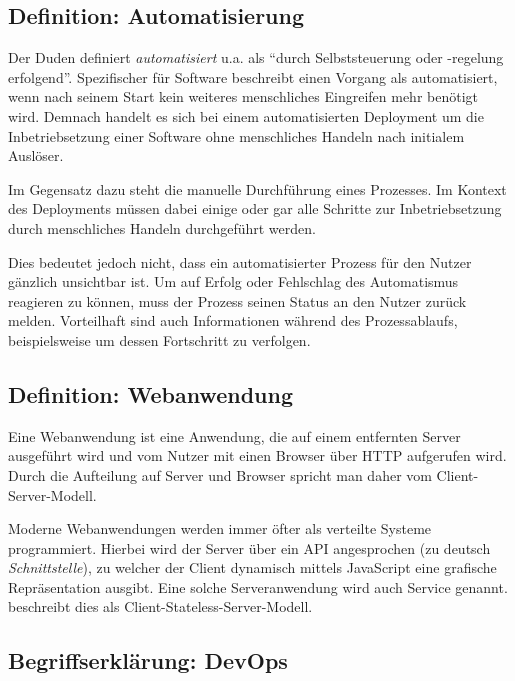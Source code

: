 \subsection{Definition: Automatisierung}

Der Duden \citeyearpar{Duden} definiert \emph{automatisiert} u.a. als ``durch Selbststeuerung oder -regelung erfolgend''. Spezifischer für Software beschreibt \citet[27]{Duvall2007} einen Vorgang als automatisiert, wenn nach seinem Start kein weiteres menschliches Eingreifen mehr benötigt wird. Demnach handelt es sich bei einem automatisierten Deployment um die Inbetriebsetzung einer Software ohne menschliches Handeln nach initialem Auslöser.

Im Gegensatz dazu steht die manuelle Durchführung eines Prozesses. Im Kontext des Deployments müssen dabei einige oder gar alle Schritte zur Inbetriebsetzung durch menschliches Handeln durchgeführt werden.

Dies bedeutet jedoch nicht, dass ein automatisierter Prozess für den Nutzer gänzlich unsichtbar ist. Um auf Erfolg oder Fehlschlag des Automatismus reagieren zu können, muss der Prozess seinen Status an den Nutzer zurück melden. Vorteilhaft sind auch Informationen während des Prozessablaufs, beispielsweise um dessen Fortschritt zu verfolgen. \citep[10f]{Duvall2007}

\subsection{Definition: Webanwendung}

Eine Webanwendung ist eine Anwendung, die auf einem entfernten Server ausgeführt wird und vom Nutzer mit einen Browser über \ac{HTTP} aufgerufen wird. Durch die Aufteilung auf Server und Browser spricht man daher vom Client-Server-Modell.

Moderne Webanwendungen werden immer öfter als verteilte Systeme programmiert. Hierbei wird der Server über ein \ac{API} angesprochen (zu deutsch \emph{Schnittstelle}), zu welcher der Client dynamisch mittels JavaScript eine grafische Repräsentation ausgibt. Eine solche Serveranwendung wird auch Service genannt. \citep[Kapitel 5.1.3]{Fielding} beschreibt dies als Client-Stateless-Server-Modell.

\subsection{Begriffserklärung: DevOps}
\label{subsec:devops}

